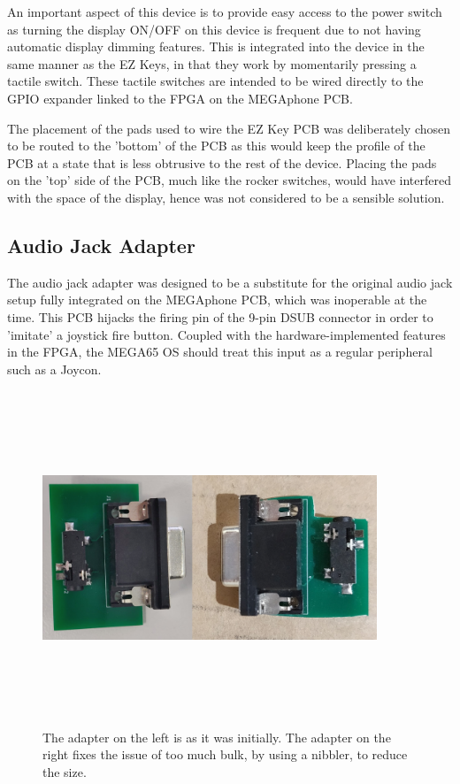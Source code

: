 An important aspect of this device is to provide easy access to the power switch as turning the display ON/OFF on this device is frequent due to not having automatic display dimming features.
This is integrated into the device in the same manner as the EZ Keys, in that they work by momentarily pressing a tactile switch.
These tactile switches are intended to be wired directly to the GPIO expander linked to the FPGA on the MEGAphone PCB.

The placement of the pads used to wire the EZ Key PCB was deliberately chosen to be routed to the 'bottom' of the PCB as this would keep the profile of the PCB at a state that is less obtrusive to the rest of the device.
Placing the pads on the 'top' side of the PCB, much like the rocker switches, would have interfered with the space of the display, hence was not considered to be a sensible solution.

\subsection{Audio Jack Adapter} \label{Adapter}

The audio jack adapter was designed to be a substitute for the original audio jack setup fully integrated on the MEGAphone PCB, which was inoperable at the time.
This PCB hijacks the firing pin of the 9-pin DSUB connector in order to 'imitate' a joystick fire button. 
Coupled with the hardware-implemented features in the FPGA, the MEGA65 OS should treat this input as a regular peripheral such as a Joycon.

\begin{figure} [h]
    \centering
    \includegraphics[width=10cm,height=10cm,keepaspectratio]{Figures/adapter_physical.png}
    \caption{The adapter on the left is as it was initially. The adapter on the right fixes the issue of too much bulk, by using a nibbler, to reduce the size.}
    \label{fig:Adapter}
\end{figure}


